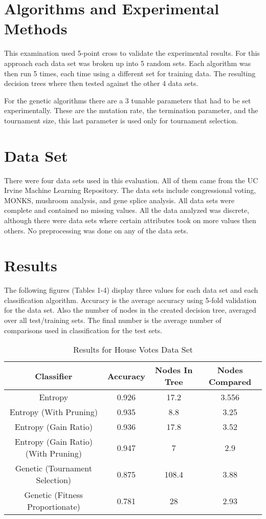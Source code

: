 \documentclass[12pt,letterpaper]{article}
\begin{document}
\section{Algorithms and Experimental Methods}
This examination used 5-point cross to validate the experimental results. For this approach each data set was broken up into 5 random sets. Each algorithm was then run 5 times, each time using a different set for training data. The resulting decision trees where then tested against the other 4 data sets. 

For the genetic algorithms there are a 3 tunable parameters that had to be set experimentally. These are the mutation rate, the termination parameter, and the tournament size, this last parameter is used only for tournament selection. 

\section{Data Set}
There were four data sets used in this evaluation. All of them came from the  UC Irvine Machine Learning Repository. The data sets include congressional voting, MONKS, mushroom analysis, and gene splice analysis. All data sets were complete and contained no missing values. All the data analyzed was discrete, although there were data sets where certain attributes took on more values then others. No preprocessing was done on any of the data sets. 

\section{Results}
The following figures (Tables 1-4)  display three values for each data set and each classification algorithm. Accuracy is the average accuracy using 5-fold validation for the data set. Also the number of nodes in the created decision tree, averaged over all test/training sets. The final number is the average number of comparisons used in classification for the test sets. 
\begin{table}[h]
\begin{tabular}{ |c|c|c|c| }
\hline
Classifier  &   Accuracy & Nodes In Tree  & Nodes Compared\\
\hline
Entropy & 0.926 & 17.2 & 3.556 \\
Entropy (With Pruning) & 0.935 & 8.8 & 3.25 \\
Entropy (Gain Ratio) & 0.936 & 17.8 & 3.52 \\
Entropy (Gain Ratio) (With Pruning) & 0.947 & 7 & 2.9 \\
\hline
Genetic (Tournament Selection) & 0.875 & 108.4 & 3.88 \\
Genetic (Fitness Proportionate) & 0.781 & 28 & 2.93 \\
\hline
\end{tabular}
\caption{Results for House Votes Data Set }

\end{table}
\end{document}
